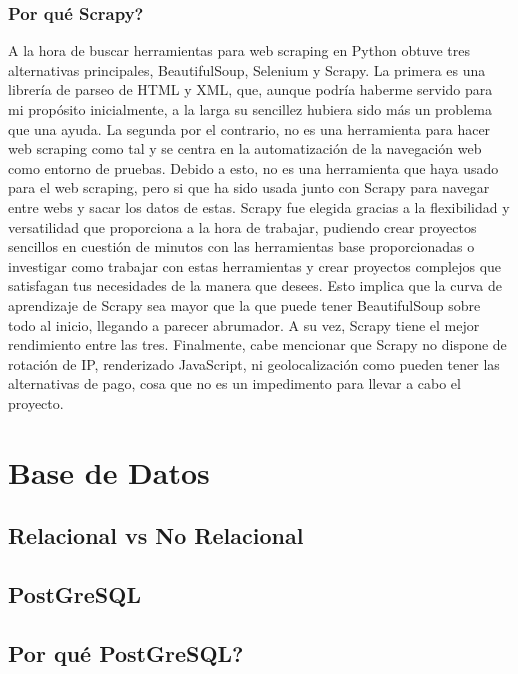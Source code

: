 \subsubsection{Por qué Scrapy?}
A la hora de buscar herramientas para web scraping en Python obtuve tres alternativas principales, BeautifulSoup, Selenium y Scrapy.
\newline
\newline
La primera es una librería de parseo de HTML y XML, que, aunque podría haberme servido para mi propósito inicialmente, a la larga su sencillez hubiera sido más un problema que una ayuda.
\newline
\newline
La segunda por el contrario, no es una herramienta para hacer web scraping como tal y se centra en la automatización de la navegación web como entorno de pruebas. Debido a esto, no es una herramienta que haya usado para el web scraping, pero si que ha sido usada junto con Scrapy para navegar entre webs 
y sacar los datos de estas.
\newline
\newline
Scrapy fue elegida gracias a la flexibilidad y versatilidad que proporciona a la hora de trabajar, pudiendo crear proyectos sencillos en cuestión de minutos con las herramientas base proporcionadas o investigar como trabajar con estas herramientas y crear proyectos complejos que satisfagan tus necesidades de la manera que desees. Esto implica que la curva de aprendizaje de Scrapy sea mayor que la que puede tener BeautifulSoup sobre todo al inicio, llegando a parecer abrumador. A su vez, Scrapy tiene el mejor rendimiento entre las tres. \cite{glez2014web}
\newline
\newline
Finalmente, cabe mencionar que Scrapy no dispone de rotación de IP, renderizado JavaScript, ni geolocalización como pueden tener las alternativas de pago, cosa que no es un impedimento para llevar a cabo el proyecto. 

\newpage

\section{Base de Datos}

\subsection{Relacional vs No Relacional}

\subsection{PostGreSQL}

\subsection{Por qué PostGreSQL?}